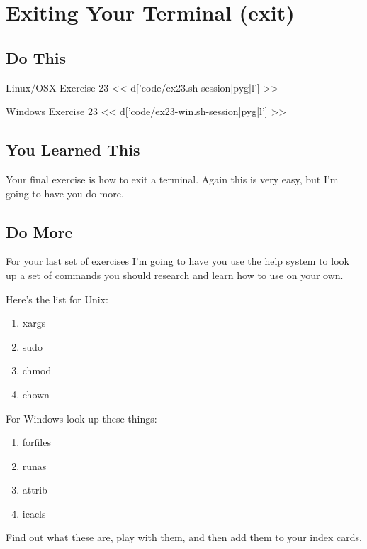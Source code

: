 \chapter{Exiting Your Terminal (exit)}

\section{Do This}

\begin{code}{Linux/OSX Exercise 23}
<< d['code/ex23.sh-session|pyg|l'] >>
\end{code}

\begin{code}{Windows Exercise 23}
<< d['code/ex23-win.sh-session|pyg|l'] >>
\end{code}

\section{You Learned This}

Your final exercise is how to exit a terminal.  Again this is very easy, but
I'm going to have you do more.

\section{Do More}

For your last set of exercises I'm going to have you use the help system to look up
a set of commands you should research and learn how to use on your own.

Here's the list for Unix:

\begin{enumerate}
\item xargs
\item sudo
\item chmod
\item chown
\end{enumerate}


For Windows look up these things:

\begin{enumerate}
\item forfiles
\item runas
\item attrib
\item icacls
\end{enumerate}

Find out what these are, play with them, and then add them to your index cards.
